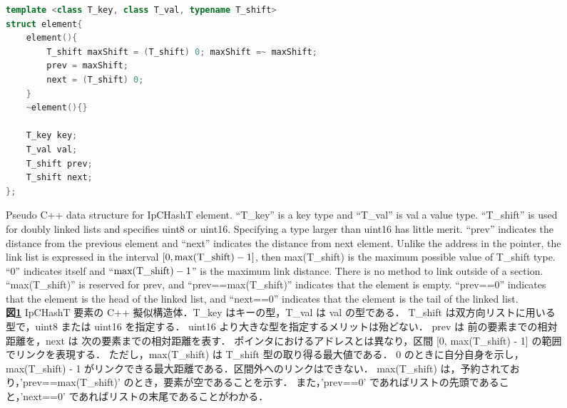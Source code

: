 \begin{figure} %
\begin{lstlisting}[language=C++]
template <class T_key, class T_val, typename T_shift>
struct element{
	element(){
		T_shift maxShift = (T_shift) 0; maxShift =~ maxShift;
		prev = maxShift;
		next = (T_shift) 0;
	}
	~element(){}
	
	T_key key;
	T_val val;
	T_shift prev;
	T_shift next;
};
\end{lstlisting}
\caption{
  Pseudo C++ data structure for IpCHashT element. ``T\_key'' is a key type and ``T\_val'' is val a value type.
  ``T\_shift'' is used for doubly linked lists and specifies uint8 or uint16.
  Specifying a type larger than uint16 has little merit.
  ``prev'' indicates the distance from the previous element and 
  ``next'' indicates the distance from next element.
  Unlike the address in the pointer, the link list is expressed in the interval $[0, {\rm max(T\_shift)}-1]$,
  then max(T\_shift) is the maximum possible value of T\_shift type.
  ``$0$'' indicates itself and ``${\rm max(T\_shift)}-1$'' is the maximum link distance.
  There is no method to link outside of a section.
  ``max(T\_shift)'' is reserved for prev, and ``prev==max(T\_shift)'' indicates that the element is empty.
  ``prev==0'' indicates that the element is the head of the linked list,
  and ``next==0'' indicates that the element is the tail of the linked list.
  \\
  {\bf 図\ref{fig_IpCHashT_struct}}
  IpCHashT 要素の C++ 擬似構造体．T\_key はキーの型，T\_val は val の型である．
  T\_shift は双方向リストに用いる型で，uint8 または uint16 を指定する．
  uint16 より大きな型を指定するメリットは殆どない．
  prev は 前の要素までの相対距離を，next は 次の要素までの相対距離を表す．
  ポインタにおけるアドレスとは異なり，区間 [0, max(T\_shift) - 1] の範囲でリンクを表現する．
  ただし，max(T\_shift) は T\_shift 型の取り得る最大値である．
  0 のときに自分自身を示し，max(T\_shift) - 1 がリンクできる最大距離である．区間外へのリンクはできない．
  max(T\_shift) は，予約されており，'prev==max(T\_shift)' のとき，要素が空であることを示す．
  また，'prev==0' であればリストの先頭であること，'next==0' であればリストの末尾であることがわかる．
}
\label{fig_IpCHashT_struct}
\end{figure}


